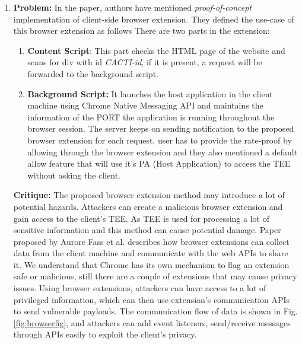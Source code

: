\documentclass[runningheads,10pt]{llncs}
\begin{document}
	\begin{enumerate}
		\item \textbf{Problem:} In the paper, authors have mentioned \textit{proof-of-concept} implementation of client-side browser extension. They defined the use-case of this browser extension as follows
		There are two parts in the extension:
		\begin{enumerate}
			\item \textbf{Content Script}: This part checks the HTML page of the website and scans for div with id \textit{CACTI-id}, if it is present, a request will be forwarded to the background script.
			\item 	\textbf{Background Script:} It launches the host application in the client machine using Chrome Native Messaging API and maintains the information of the PORT the application is running throughout the browser session.
			The server keeps on sending notification to the proposed browser extension for each request, user has to provide the rate-proof by allowing through the browser extension and they also mentioned a default allow feature that will use it’s PA (Host Application) to access the TEE without asking the client.\\
		\end{enumerate}


		\textbf{Critique:} The proposed browser extension method may introduce a lot of potential hazards. Attackers can create a malicious browser extension and gain access to the client's TEE. As TEE is used for processing a lot of sensitive information and this method can cause potential damage. Paper proposed by Aurore Fass et al.\cite{ref2} describes how browser extensions can collect data from the client machine and communicate with the web APIs to share it. We understand that Chrome has its own mechanism to flag an extension safe or malicious, still there are a couple of extensions that may cause privacy issues. Using browser extensions, attackers can have access to a lot of privileged information, which can then use extension’s communication APIs to send vulnerable payloads. The communication flow of data is shown in Fig. \ref{fig:browserfig}, and attackers can add event listeners, send/receive messages through APIs easily to exploit the client’s privacy.


\end{enumerate}
\end{document}
